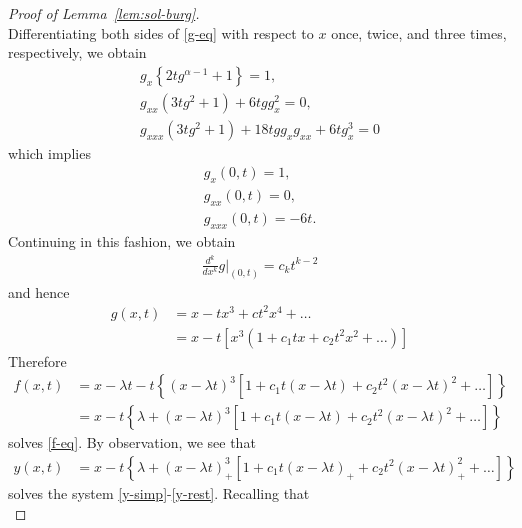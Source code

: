 \documentclass[12pt,reqno]{amsart}
\numberwithin{equation}{section}  %
\numberwithin{figure}{section}
\begin{document}
\begin{proof}[Proof of Lemma~\ref{lem:sol-burg}]
\begin{equation*}
\end{equation*}
%
%
Differentiating both sides of \eqref{g-eq} with respect to $x$ once, twice, and
three times, respectively, we obtain
%
%
\begin{gather*}
    g_{x}\left \{ 2t g^{\alpha - 1} + 1 \right \} = 1,
    \\
    g_{xx}(3tg^{2} + 1) + 6tgg_{x}^{2} = 0,
    \\
    g_{xxx}(3tg^{2} + 1) + 18tgg_{x}g_{xx} + 6tg_{x}^{3} = 0
\end{gather*}
%
%
which implies
%
%
\begin{gather*}
g_{x}(0, t) =1,
\\
g_{xx}(0, t) = 0,
\\
g_{xxx}(0, t) = -6t.
\end{gather*}
%
Continuing in this fashion, we obtain
%
%
\begin{equation*}
\begin{split}
\frac{d^{k}}{dx^{k}} g |_{(0, t)} = c_{k}t^{k-2}
\end{split}
\end{equation*}
%
%
and hence
%
%
\begin{equation*}
\begin{split}
g(x,t) & = x - tx^{3} + ct^{2}x^{4} + \ldots
\\
& = x - t[x^{3}(1 + c_{1}tx + c_{2}t^{2}x^{2} + \ldots)] 
\end{split}
\end{equation*}
%
%
Therefore
%
%
\begin{equation*}
\begin{split}
f(x,t) 
& = x - \lambda t - t \left \{ (x - \lambda t)^{3}[1 + c_{1}t(x - \lambda t) + c_{2}t^{2}(x - \lambda t)^{2} + \ldots] \right \}
\\
& = x - t \left \{ \lambda  + (x - \lambda t)^{3} [1 + c_{1}t(x - \lambda t) + c_{2}t^{2}(x - \lambda t)^{2} + \ldots] \right \}
\end{split}
\end{equation*}
%
solves \eqref{f-eq}. By observation, we see that
%
%
\begin{equation*}
\begin{split}
y(x,t) 
& = x - t \left \{ \lambda  + (x - \lambda
    t)_{+}^{3} [1 + c_{1}t(x - \lambda t)_{+} +
    c_{2}t^{2}(x - \lambda t)_{+}^{2} + \ldots] \right \}
\end{split}
\end{equation*}
%
%
solves the system \eqref{y-simp}-\eqref{y-rest}.
%
%
%
Recalling that
%
%
\begin{equation*}

\end{equation*}
\end{proof}
\end{document}
